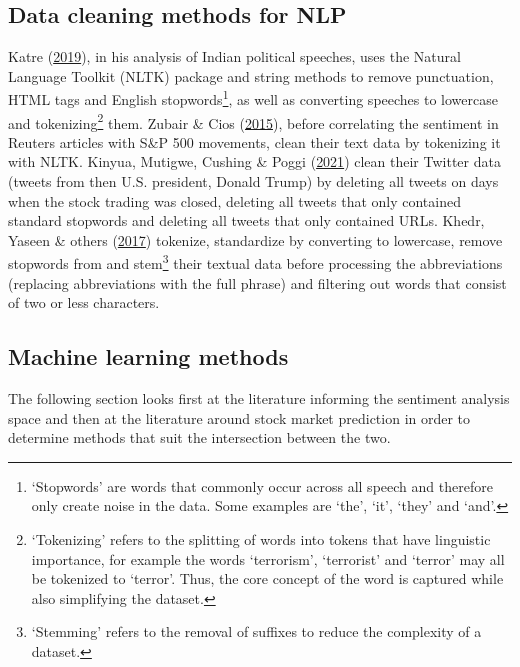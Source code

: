 \documentclass[11pt,preprint, authoryear]{elsarticle}
\numberwithin{equation}{section}
\numberwithin{figure}{section}
\numberwithin{table}{section}
\let\rmarkdownfootnote\footnote%
\def\footnote{\protect\rmarkdownfootnote}
\begin{document}
\hypertarget{data-cleaning-methods-for-nlp}{%
\subsection{\texorpdfstring{Data cleaning methods for NLP
\label{data cleaning}}{Data cleaning methods for NLP }}\label{data-cleaning-methods-for-nlp}}

Katre (\protect\hyperlink{ref-katre2019nlp}{2019}), in his analysis of
Indian political speeches, uses the Natural Language Toolkit (NLTK)
package and string methods to remove punctuation, HTML tags and English
stopwords\footnote{`Stopwords' are words that commonly occur across all
  speech and therefore only create noise in the data. Some examples are
  `the', `it', `they' and `and'.}, as well as converting speeches to
lowercase and tokenizing\footnote{`Tokenizing' refers to the splitting
  of words into tokens that have linguistic importance, for example the
  words `terrorism', `terrorist' and `terror' may all be tokenized to
  `terror'. Thus, the core concept of the word is captured while also
  simplifying the dataset.} them. Zubair \& Cios
(\protect\hyperlink{ref-zubair2015extracting}{2015}), before correlating
the sentiment in Reuters articles with S\&P 500 movements, clean their
text data by tokenizing it with NLTK. Kinyua, Mutigwe, Cushing \& Poggi
(\protect\hyperlink{ref-kinyua2021analysis}{2021}) clean their Twitter
data (tweets from then U.S. president, Donald Trump) by deleting all
tweets on days when the stock trading was closed, deleting all tweets
that only contained standard stopwords and deleting all tweets that only
contained URLs. Khedr, Yaseen \& others
(\protect\hyperlink{ref-khedr2017predicting}{2017}) tokenize,
standardize by converting to lowercase, remove stopwords from and
stem\footnote{`Stemming' refers to the removal of suffixes to reduce the
  complexity of a dataset.} their textual data before processing the
abbreviations (replacing abbreviations with the full phrase) and
filtering out words that consist of two or less characters.

\hypertarget{machine-learning-methods}{%
\subsection{\texorpdfstring{Machine learning methods
\label{ML}}{Machine learning methods }}\label{machine-learning-methods}}

The following section looks first at the literature informing the
sentiment analysis space and then at the literature around stock market
prediction in order to determine methods that suit the intersection
between the two.
\end{document}
